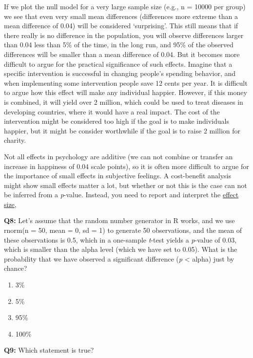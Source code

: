 \documentclass[
]{krantz}
\providecommand{\tightlist}{%
  \setlength{\itemsep}{0pt}\setlength{\parskip}{0pt}}
\begin{document}
If we plot the null model for a very large sample size (e.g., n = 10000 per group) we see that even very small mean differences (differences more extreme than a mean difference of 0.04) will be considered `surprising'. This still means that if there really is no difference in the population, you will observe differences larger than 0.04 less than 5\% of the time, in the long run, and 95\% of the observed differences will be smaller than a mean difference of 0.04. But it becomes more difficult to argue for the practical significance of such effects. Imagine that a specific intervention is successful in changing people's spending behavior, and when implementing some intervention people save 12 cents per year. It is difficult to argue how this effect will make any individual happier. However, if this money is combined, it will yield over 2 million, which could be used to treat diseases in developing countries, where it would have a real impact. The cost of the intervention might be considered too high if the goal is to make individuals happier, but it might be consider worthwhile if the goal is to raise 2 million for charity.

Not all effects in psychology are additive (we can not combine or transfer an increase in happiness of 0.04 scale points), so it is often more difficult to argue for the importance of small effects in subjective feelings. A cost-benefit analysis might show small effects matter a lot, but whether or not this is the case can not be inferred from a \emph{p}-value. Instead, you need to report and interpret the \protect\hyperlink{effectsize}{effect size},

\textbf{Q8:} Let's assume that the random number generator in R works, and we use rnorm(n = 50, mean = 0, sd = 1) to generate 50 observations, and the mean of these observations is 0.5, which in a one-sample \emph{t}-test yields a \emph{p}-value of 0.03, which is smaller than the alpha level (which we have set to 0.05). What is the probability that we have observed a significant difference (\emph{p} \textless{} alpha) just by chance?

\begin{enumerate}
\def\labelenumi{\Alph{enumi})}
\tightlist
\item
  3\%
\item
  5\%
\item
  95\%
\item
  100\%
\end{enumerate}

\textbf{Q9:} Which statement is true?
\end{document}
